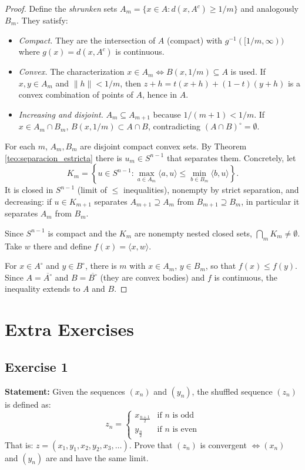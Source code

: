\documentclass[11pt, a4paper]{article}
\begin{document}
\begin{proof}
Define the \emph{shrunken} sets $A_m = \{x \in A : d(x, A^c) \ge 1/m\}$ and analogously $B_m$.
They satisfy:
\begin{itemize}
    \item \textit{Compact.} They are the intersection of $A$ (compact) with $g^{-1}([1/m, \infty))$ where
    $g(x) = d(x, A^c)$ is continuous.
    \item \textit{Convex.} The characterization $x \in A_m \iff B(x, 1/m) \subseteq A$ is used. If
    $x, y \in A_m$ and $\|h\| < 1/m$, then $z + h = t(x+h) + (1-t)(y+h)$ is a convex combination
    of points of $A$, hence in $A$.
    \item \textit{Increasing and disjoint.} $A_m \subseteq A_{m+1}$ because $1/(m+1) < 1/m$. If
    $x \in A_m \cap B_m$, $B(x, 1/m) \subset A \cap B$, contradicting
    $(A \cap B)^\circ = \emptyset$.
\end{itemize}

For each $m$, $A_m, B_m$ are disjoint compact convex sets. By Theorem \ref{teo:separacion_estricta} there is
$u_m \in S^{n-1}$ that separates them. Concretely, let
$$ K_m = \left\{ u \in S^{n-1} : \max_{a \in A_m} \langle a, u \rangle \le \min_{b \in B_m} \langle
b, u \rangle \right\}. $$
It is closed in $S^{n-1}$ (limit of $\le$ inequalities), nonempty by strict separation, and
decreasing: if $u \in K_{m+1}$ separates $A_{m+1} \supseteq A_m$ from $B_{m+1} \supseteq B_m$, in
particular it separates $A_m$ from $B_m$.

Since $S^{n-1}$ is compact and the $K_m$ are nonempty nested closed sets,
$\bigcap_m K_m \ne \emptyset$. Take $w$ there and define $f(x) = \langle x, w \rangle$.

For $x \in A^\circ$ and $y \in B^\circ$, there is $m$ with $x \in A_m$, $y \in B_m$, so that
$f(x) \le f(y)$. Since $A = \overline{A^\circ}$ and $B = \overline{B^\circ}$ (they are convex bodies) and
$f$ is continuous, the inequality extends to $A$ and $B$.
\end{proof}

\newpage

\section{Extra Exercises}
\subsection*{Exercise 1}

\textbf{Statement:}
Given the sequences $(x_n)$ and $(y_n)$, the shuffled sequence $(z_n)$ is defined as:
$$ z_n = \begin{cases} x_{\frac{n+1}{2}} & \text{if } n \text{ is odd} \\ y_{\frac{n}{2}} &
\text{if } n \text{ is even} \end{cases} $$
That is: $z = (x_1, y_1, x_2, y_2, x_3, \dots)$.
Prove that $(z_n)$ is convergent $\iff (x_n)$ and $(y_n)$ are and have the same limit.
\end{document}
